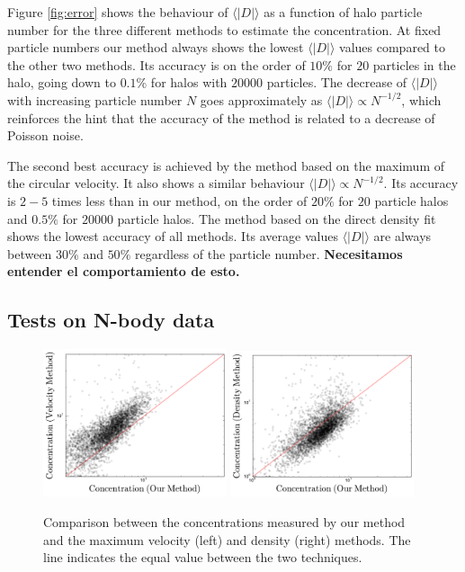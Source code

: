 \documentclass[useAMS,usenatbib]{mn2e}
\newcommand{\avg}[1]{\langle{#1}\rangle}
\begin{document}
Figure \ref{fig:error} shows the behaviour of $\avg{|D|}$ as a function of
halo particle number for the three different methods to estimate the
concentration.
At fixed particle numbers our method always shows the lowest
$\avg{|D|}$ values compared to the other two methods.
Its accuracy is on the order of $10\%$ for $20$ particles in the halo,
going down to $0.1\%$ for halos with $20000$ particles.
The decrease of $\avg{|D|}$ with increasing particle number $N$ goes
approximately as $\avg{|D|}\propto N^{-1/2}$, which reinforces the hint that
the accuracy of the method is related to a decrease of Poisson
noise.

The second best accuracy is achieved by the method based on the
maximum of the circular velocity.
It also shows a similar behaviour $\avg{|D|}\propto N^{-1/2}$.
Its accuracy is $2-5$ times less than in our method, on the order of
$20\%$ for $20$ particle halos and $0.5\%$ for $20000$ particle halos.
The method based on the direct density fit shows the lowest accuracy
of all methods.
Its average values $\avg{|D|}$ are always between $30\%$ and $50\%$
regardless of the particle number. {\bf Necesitamos entender el
  comportamiento de esto.}

\subsection{Tests on N-body data}
\label{sec:data}
\begin{figure}
  \begin{center}
    \includegraphics[width=0.48\textwidth]{mass-velocity.pdf}
    \includegraphics[width=0.48\textwidth]{mass-density.pdf}
  \end{center}
  \caption{Comparison between the concentrations measured by our
    method and the maximum velocity (left) and density (right)
    methods. The line indicates the equal value between the two
    techniques.
  \label{fig:mdv}}
\end{figure}
\end{document}

